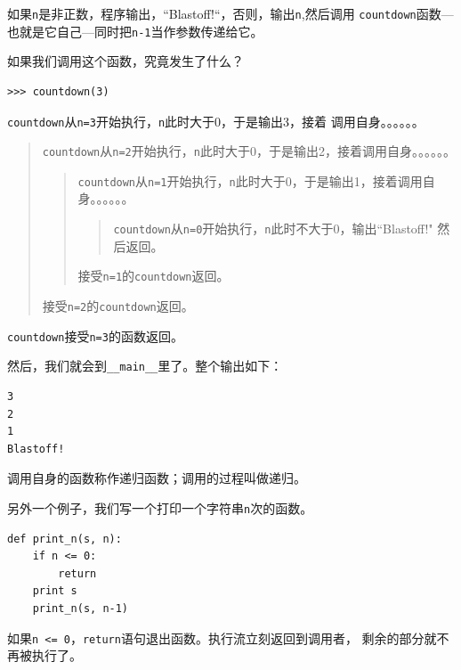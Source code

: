 {如果{\tt n}是非正数，程序输出，“Blastoff!“，否则，输出{\tt n},然后调用
{\tt countdown}函数---也就是它自己---同时把{\tt n-1}当作参数传递给它。

如果我们调用这个函数，究竟发生了什么？

\beforeverb
\begin{verbatim}
>>> countdown(3)
\end{verbatim}
\afterverb
%
{\tt countdown}从{\tt n=3}开始执行，{\tt n}此时大于0，于是输出3，接着
调用自身。。。。。。

\begin{quote}
{\tt countdown}从{\tt n=2}开始执行，{\tt n}此时大于0，于是输出2，接着调用自身。。。。。。

\begin{quote}
{\tt countdown}从{\tt n=1}开始执行，{\tt n}此时大于0，于是输出1，接着调用自身。。。。。。

\begin{quote}
{\tt countdown}从{\tt n=0}开始执行，{\tt n}此时不大于0，输出“Blastoff!"
然后返回。
\end{quote}

接受{\tt n=1}的{\tt countdown}返回。
\end{quote}

接受{\tt n=2}的{\tt countdown}返回。
\end{quote}


{\tt countdown}接受{\tt n=3}的函数返回。

然后，我们就会到\verb"__main__"里了。整个输出如下：

\beforeverb
\begin{verbatim}
3
2
1
Blastoff!
\end{verbatim}
\afterverb

 调用自身的函数称作递归函数；调用的过程叫做递归。


另外一个例子，我们写一个打印一个字符串{\tt n}次的函数。

\beforeverb
\begin{verbatim}
def print_n(s, n):
    if n <= 0:
        return
    print s
    print_n(s, n-1)
\end{verbatim}
\afterverb

如果{\tt n <= 0}，{\tt return}语句退出函数。执行流立刻返回到调用者，
剩余的部分就不再被执行了。


}
